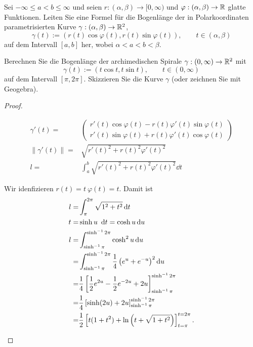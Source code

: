 \begin{Problem}
	\begin{parts}
	\item Sei $-\infty\le a < b\le \infty$ und seien $r:(\alpha,\beta)\to [0,\infty)$ und $\varphi: (\alpha,\beta)\to \mathbb{R}$ glatte Funktionen. Leiten Sie eine Formel für die Bogenlänge der in Polarkoordinaten parametrisierten Kurve $\gamma:(\alpha,\beta)\to \mathbb{R}^2$,
	\[
	\gamma(t):=(r(t)\cos\varphi(t), r(t)\sin\varphi(t)),\qquad t\in (\alpha,\beta)
	\]
	auf dem Intervall $[a,b]$ her, wobei $\alpha<a<b<\beta$.
\item Berechnen Sie die Bogenlänge der archimedischen Spirale $\gamma:(0,\infty)\to \mathbb{R}^2$ mit
	\[
	\gamma(t):=(t\cos t, t\sin t),\qquad t\in (0,\infty)
	\]
	auf dem Intervall $[\pi,2\pi]$. Skizzieren Sie die Kurve $\gamma$ (oder zeichnen Sie mit Geogebra).
\end{parts}
\end{Problem}
\begin{proof}
	\begin{parts}
	\item 
		\begin{align*}
			\gamma'(t)=& \begin{pmatrix} r'(t)\cos\varphi(t)-r(t)\varphi'(t)\sin\varphi(t) \\ r'(t)\sin\varphi(t) + r(t)\varphi'(t)\cos\varphi(t) \end{pmatrix}\\
				\|\gamma'(t)\|=&\sqrt{r'(t)^2+r(t)^2\varphi'(t)^2}\\
				l=&\int_a^b \sqrt{r'(t)^2+r(t)^2\varphi'(t)^2} \dd{t}
		\end{align*}
	\item Wir idenfizieren $r(t)=t~\varphi(t)=t$. Damit ist
		\begin{align*}
			l=&\int_\pi^{2\pi} \sqrt{1^2+t^2} \dd{t}\\
			t=&\sinh u~\dd{t}=\cosh u\dd{u}\\
			l=&\int_{\sinh^{-1}\pi}^{\sinh^{-1}2\pi}\cosh^2 u \dd{u}\\
			=&\int_{\sinh^{-1}\pi}^{\sinh^{-1}2\pi}\frac{1}{4}\left( e^u + e^{-u} \right)^2 \dd{u}\\
			=&\frac{1}{4}\left[ \frac{1}{2}e^{2u}-\frac{1}{2}e^{-2u}+2u \right]_{\sinh^{-1}\pi}^{\sinh^{-1}2\pi}\\
			=&\frac{1}{4}\left[\sinh(2u)+2u \right]_{\sinh^{-1}\pi}^{\sinh^{-1}2\pi}\\
			=&\frac{1}{2}\left[ t(1+t^2)+\ln\left( t+\sqrt{1+t^2}  \right)  \right]_{t=\pi}^{t=2\pi}.\qedhere
		\end{align*}
	\end{parts}
\end{proof}
